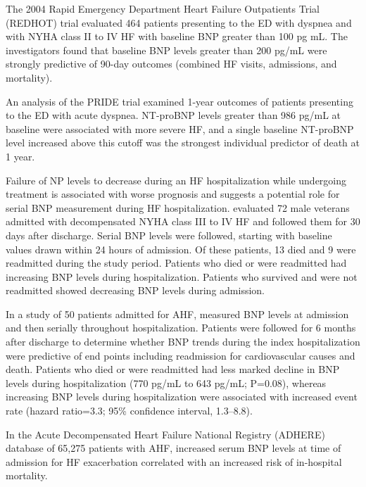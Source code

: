 \documentclass[14pt,a4paper,onecolumn]{extarticle}
\begin{document}
The 2004 Rapid Emergency Department Heart Failure Outpatients Trial (REDHOT) trial evaluated 464 patients presenting to the ED with dyspnea and with NYHA class II to IV HF with baseline BNP greater than 100 pg mL. The investigators found that baseline BNP levels greater than 200 pg/mL were strongly predictive of 90-day outcomes (combined HF visits, admissions, and mortality). \citep{Maisel2004} %

An analysis of the PRIDE trial examined 1-year outcomes of patients presenting to the ED with acute dyspnea. NT-proBNP levels greater than 986 pg/mL at baseline were associated with more severe HF, and a single baseline NT-proBNP level increased above this cutoff was the strongest individual predictor of death at 1 year. \citep{Januzzi2006b} %

Failure of NP levels to decrease during an HF hospitalization while undergoing treatment is associated with worse prognosis and suggests a potential role for serial BNP measurement during HF hospitalization. \citep{Cheng2001} evaluated 72 male veterans admitted with decompensated NYHA class III to IV HF and followed them for 30 days after discharge. Serial BNP levels were followed, starting with baseline values drawn within 24 hours of admission. Of these patients, 13 died and 9 were readmitted during the study period. Patients who died or were readmitted had increasing BNP levels during hospitalization. Patients who survived and were not readmitted showed decreasing BNP levels during admission. \citep{Cheng2001} %

In a study of 50 patients admitted for AHF, \citep{Bettencourt2002} measured BNP levels at admission and then serially throughout hospitalization. Patients were followed for 6 months after discharge to determine whether BNP trends during the index hospitalization were predictive of end points including readmission for cardiovascular causes and death. Patients who died or were readmitted had less marked decline in BNP levels during hospitalization (770  pg/mL to 643  pg/mL; P=0.08), whereas increasing BNP levels during hospitalization were associated with increased event rate (hazard ratio=3.3; 95\% confidence interval, 1.3–8.8). %

In the Acute Decompensated Heart Failure National Registry (ADHERE) database of 65,275 patients with AHF, increased serum BNP levels at time of admission for HF exacerbation correlated with an increased risk of in-hospital mortality. \citep{Fonarow2007} %
\end{document}
